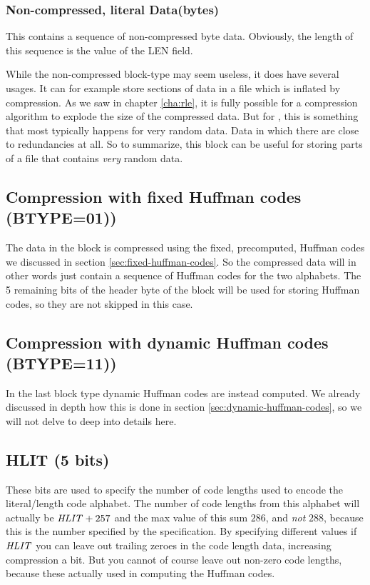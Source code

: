 \subsubsection{Non-compressed, literal Data(bytes)}

This contains a sequence of non-compressed byte data. Obviously, the
length of this sequence is the value of the LEN field.

While the non-compressed block-type may seem useless, it does have
several usages. It can for example store sections of data in a file
which is inflated by compression. As we saw in chapter \ref{cha:rle},
it is fully possible for a compression algorithm to explode the size
of the compressed data. But for , this is something that most
typically happens for very random data. Data in which there are close
to redundancies at all. So to summarize, this block can be useful for
storing parts of a file that contains \textit{very} random data.

\subsection{Compression with fixed Huffman codes (BTYPE=01))}

The data in the block is compressed using the fixed, precomputed,
Huffman codes we discussed in section
\ref{sec:fixed-huffman-codes}. So the compressed data will in other
words just contain a sequence of Huffman codes for the two
alphabets. The 5 remaining bits of the header byte of the block will
be used for storing Huffman codes, so they are not skipped in this
case.

\subsection{Compression with dynamic Huffman codes (BTYPE=11))}

In the last block type dynamic Huffman codes are instead computed. We
already discussed in depth how this is done in section
\ref{sec:dynamic-huffman-codes}, so we will not delve to deep into
details here.

\subsection{HLIT (5 bits)}

These bits are used to specify the number of code lengths used to
encode the literal/length code alphabet. The number of code lengths
from this alphabet will actually be $\mathit{HLIT} + 257$ and the max
value of this sum $286$, and \textit{not} $288$, because this is the
number specified by the  specification. By specifying different
values if $\mathit{HLIT}$ you can leave out trailing zeroes in the code
length data, increasing compression a bit. But you cannot of course
leave out non-zero code lengths, because these actually used in
computing the Huffman codes.

